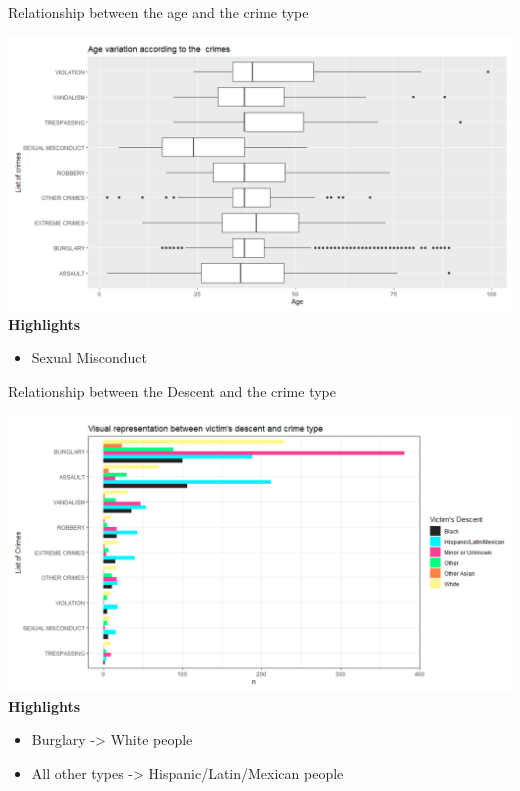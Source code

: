 \documentclass{beamer}\usepackage[]{graphicx}\usepackage[]{xcolor}
\makeatletter
\def\maxwidth{ %
  \ifdim\Gin@nat@width>\linewidth
    \linewidth
  \else
    \Gin@nat@width
  \fi
}
\newenvironment{knitrout}{}{} %
\makeatother
\begin{document}
\begin{frame}[fragile]{Relationship between the age and the crime type}

\begin{knitrout}
\color{fgcolor}
\includegraphics[width=\maxwidth]{figure/box_age.png} 
\end{knitrout}
\textbf{Highlights}
\begin{itemize}
\item Sexual Misconduct

\end{itemize}
\end{frame}

\begin{frame}[fragile]{Relationship between the Descent and the crime type}

\begin{knitrout}
\color{fgcolor}
\includegraphics[width=\maxwidth]{figure/descent.png} 
\end{knitrout}
\textbf{Highlights}
\begin{itemize}
\item Burglary -> White people
\item All other types -> Hispanic/Latin/Mexican people
\end{itemize}
\end{frame}
\end{document}
